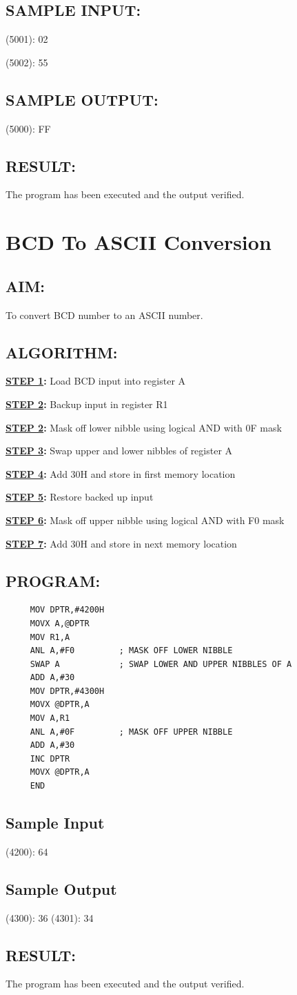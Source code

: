 \documentclass[a4paper,28pt,twoside,openright]{report}
\begin{document}
\section*{SAMPLE INPUT:}
(5001): 02

(5002): 55
\section*{SAMPLE OUTPUT:}
(5000): FF
\section*{RESULT:}
The program has been executed and the output verified.
%
%
\chapter{BCD To ASCII Conversion}
%
%
\section*{AIM:}
To convert BCD number to an ASCII number.

\section*{ALGORITHM:}

\textbf{\underline{STEP 1}:} Load BCD input into register A

\textbf{\underline{STEP 2}:} Backup input in register R1

\textbf{\underline{STEP 2}:} Mask off lower nibble using logical AND with 0F mask

\textbf{\underline{STEP 3}:} Swap upper and lower nibbles of register A

\textbf{\underline{STEP 4}:} Add 30H and store in first memory location

\textbf{\underline{STEP 5}:} Restore backed up input

\textbf{\underline{STEP 6}:} Mask off upper nibble using logical AND with F0 mask

\textbf{\underline{STEP 7}:} Add 30H and store in next memory location

\section*{PROGRAM:}

\begin{lstlisting}
     MOV DPTR,#4200H
     MOVX A,@DPTR
     MOV R1,A 
     ANL A,#F0         ; MASK OFF LOWER NIBBLE
     SWAP A            ; SWAP LOWER AND UPPER NIBBLES OF A 
     ADD A,#30
     MOV DPTR,#4300H
     MOVX @DPTR,A 
     MOV A,R1
     ANL A,#0F         ; MASK OFF UPPER NIBBLE
     ADD A,#30
     INC DPTR
     MOVX @DPTR,A
     END
\end{lstlisting}

\section*{Sample Input}
(4200): 64
\section*{Sample Output}
(4300): 36 
(4301): 34 

\section*{RESULT:}
The program has been executed and the output verified.
%
%
\end{document}
